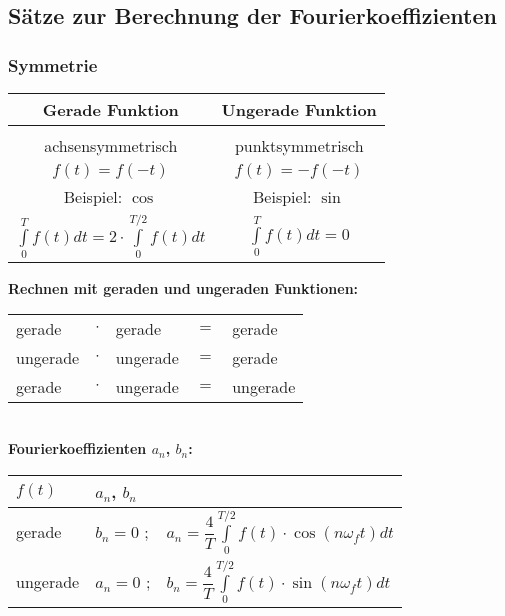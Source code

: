 	\subsection{Sätze zur Berechnung der Fourierkoeffizienten}
		\subsubsection{Symmetrie}
			\begin{minipage}[]{0.5\textwidth}
				\begin{tabular}{|c|c|}
					\hline
					\textbf{Gerade Funktion} & \textbf{Ungerade Funktion}\\[3pt]
					\hline
					\scalebox{0.45}{} & \scalebox{0.45}{}\\[3pt]
					\hline
					achsensymmetrisch & punktsymmetrisch\\[3pt]
					$\displaystyle f(t) = f(-t)$ & $f(t) = -f(-t)$\\[3pt]
					\hline
					Beispiel: $\displaystyle \cos$ & Beispiel: $\sin$\\[3pt]
					\hline
					$\displaystyle \int\limits_{0}^{T} f(t) dt = 2 \cdot \int\limits_{0}^{T/2} f(t) dt$ & $\displaystyle \int\limits_{0}^{T} f(t) dt = 0$\\[3pt]
					\hline
				\end{tabular}
			\end{minipage}
			\begin{minipage}[]{0.5\textwidth}
				\textbf{Rechnen mit geraden und ungeraden Funktionen:}\\[3pt]
				\begin{tabular}{|lclcl|}
					\hline
					gerade & $\cdot$ & gerade & $=$ & gerade\\[3pt]
					ungerade & $\cdot$ & ungerade & $=$ & gerade\\[3pt]
					gerade & $\cdot$ & ungerade & $=$ & ungerade\\[3pt]
					\hline
				\end{tabular}\\[3pt]
				\textbf{Fourierkoeffizienten $a_n$, $b_n$:}\\[3pt]
				\begin{tabular}{|l|ll|}
					\hline
					$f(t)$		&  $a_n$, $b_n$ & \\[3pt]
					\hline
					gerade		& $b_n = 0$ ; & $\displaystyle a_n = \dfrac{4}{T} \int\limits_{0}^{T/2} f(t) \cdot \cos(n \omega_f t) dt$\\[3pt]
					\hline
					ungerade	& $a_n = 0$ ; & $\displaystyle b_n = \dfrac{4}{T} \int\limits_{0}^{T/2} f(t) \cdot \sin(n \omega_f t) dt$\\[3pt]
					\hline
				\end{tabular}
			\end{minipage}
